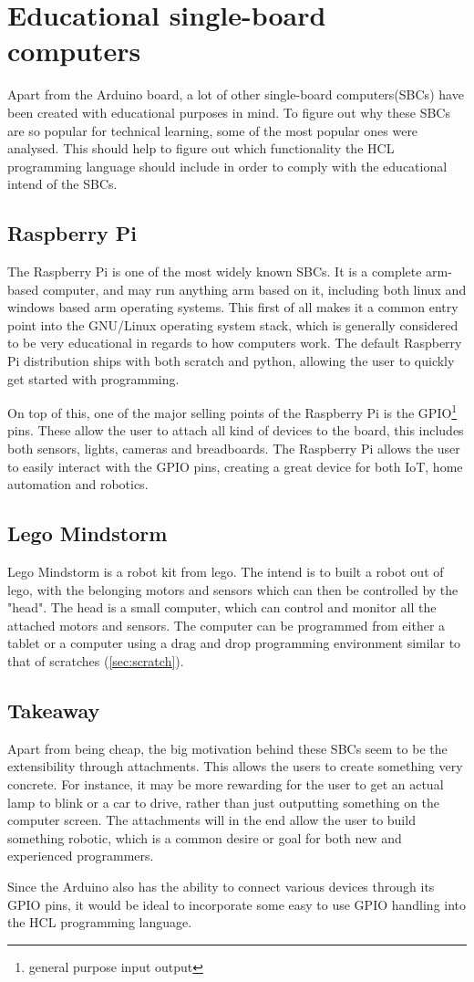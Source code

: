 \section{Educational single-board computers}

Apart from the Arduino board, a lot of other single-board computers(SBCs) have been created with educational purposes in mind.
To figure out why these SBCs are so popular for technical learning, some of the most popular ones were analysed.
This should help to figure out which functionality the HCL programming language should include in order to comply with the educational intend of the SBCs.\cite{SBC}

\subsection{Raspberry Pi}
The Raspberry Pi is one of the most widely known SBCs. 
It is a complete arm-based computer, and may run anything arm based on it, including both linux and windows based arm operating systems. 
This first of all makes it a common entry point into the GNU/Linux operating system stack, which is generally considered to be very educational in regards to how computers work.
The default Raspberry Pi distribution ships with both scratch and python, allowing the user to quickly get started with programming.\cite{RaspberryPi}

On top of this, one of the major selling points of the Raspberry Pi is the GPIO\footnote{general purpose input output} pins. 
These allow the user to attach all kind of devices to the board, this includes both sensors, lights, cameras and breadboards. 
The Raspberry Pi allows the user to easily interact with the GPIO pins, creating a great device for both IoT, home automation and robotics.\cite{RaspberryPi}

\subsection{Lego Mindstorm}
Lego Mindstorm is a robot kit from lego. 
The intend is to built a robot out of lego, with the belonging motors and sensors which can then be controlled by the "head". 
The head is a small computer, which can control and monitor all the attached motors and sensors. 
The computer can be programmed from either a tablet or a computer using a drag and drop programming environment similar to that of scratches (\ref{sec:scratch}). \cite{LegoMindstorms}

\subsection{Takeaway}
Apart from being cheap, the big motivation behind these SBCs seem to be the extensibility through attachments. 
This allows the users to create something very concrete. 
For instance, it may be more rewarding for the user to get an actual lamp to blink or a car to drive, rather than just outputting something on the computer screen. 
The attachments will in the end allow the user to build something robotic, which is a common desire or goal for both new and experienced programmers.\cite{EducationalRobotics}

Since the Arduino also has the ability to connect various devices through its GPIO pins, it would be ideal to incorporate some easy to use GPIO handling into the HCL programming language.

